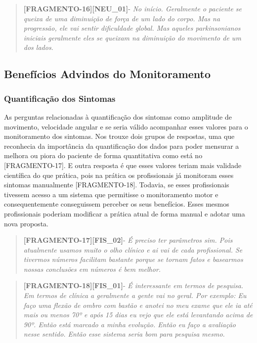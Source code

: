 \begin{quote}
\textbf{[FRAGMENTO-16][NEU\_01]}-
\emph{
No início. Geralmente o paciente se queixa de uma diminuição de força de um lado do corpo. Mas na progressão, ele vai sentir dificuldade global. Mas aqueles parkinsonianos iniciais geralmente eles se queixam na diminuição do movimento de um dos lados.
}
\end{quote}

\subsection{Benefícios Advindos do Monitoramento}


\subsubsection{Quantificação dos Sintomas}
As perguntas relacionadas à quantificação dos sintomas como amplitude de movimento, velocidade angular e se seria válido acompanhar esses valores para o monitoramento dos sintomas. Nos trouxe dois grupos de respostas, uma que reconhecia da importância da quantificação dos dados para poder mensurar a melhora ou piora do paciente de forma quantitativa como está no [FRAGMENTO-17]. E outra resposta é que esses valores teriam mais validade científica do que prática, pois na prática os profissionais já monitoram esses sintomas manualmente [FRAGMENTO-18]. Todavia, se esses profissionais tivessem acesso a um sistema que permitisse o monitoramento motor e consequentemente conseguissem perceber os seus benefícios. Esses mesmos profissionais poderiam modificar a prática atual de forma manual e adotar uma nova proposta.

\begin{quote}
\textbf{[FRAGMENTO-17][FIS\_02]}-
\emph{
É preciso ter parâmetros sim. Pois atualmente usamos muito o olho clínico e ai vai de cada profissional. Se tivermos números facilitam bastante porque se tornam fatos e basearmos nossas conclusões em números é bem melhor.
}
\end{quote}

\begin{quote}
\textbf{[FRAGMENTO-18][FIS\_01]}-
\emph{
É interessante em termos de pesquisa. Em termos de clínica a geralmente a gente vai no geral. Por exemplo: Eu faço uma flexão de ombro com bastão e anotei no meu exame que ele ia até mais ou menos 70º e após 15 dias eu vejo que ele está levantando acima de 90º. Então está marcado a minha evolução. Então eu faço a avaliação nesse sentido. Então esse sistema seria bom para pesquisa mesmo.
}
\end{quote}




